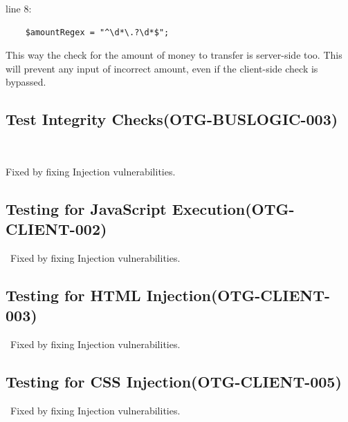 \documentclass[headsepline,footsepline,footinclude=false,oneside,fontsize=11pt,paper=a4,listof=totoc,bibliography=totoc]{scrbook} %
\begin{document}
	line 8:  
	
	\begin{lstlisting} 
	$amountRegex = "^\d*\.?\d*$";
	\end{lstlisting}
	
This way the check for the amount of money to transfer is server-side too. This will prevent any input of incorrect amount, even if the client-side check is bypassed.\\

 
\subsection{Test Integrity Checks(OTG-BUSLOGIC-003)}\

Fixed by fixing Injection vulnerabilities.\\
 
 
\subsection{Testing for JavaScript Execution(OTG-CLIENT-002)}\
Fixed by fixing Injection vulnerabilities. \\

 
\subsection{Testing for HTML Injection(OTG-CLIENT-003)}\
Fixed by fixing Injection vulnerabilities.\\ 

\subsection{Testing for CSS Injection(OTG-CLIENT-005)}\
Fixed by fixing Injection vulnerabilities.
\end{document}
